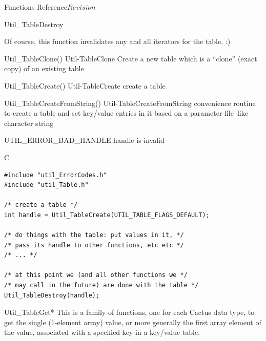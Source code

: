 \begin{cactuspart}{ Functions Reference}{}{$Revision$}
\begin{FunctionDescription}{Util\_TableDestroy}
\begin{Discussion}
Of course, this function invalidates any and all iterators for the table. :)
\end{Discussion}

\begin{SeeAlsoSection}
\begin{SeeAlso2} {Util\_TableClone()} {Util-TableClone}
Create a new table which is a ``clone'' (exact copy) of an existing
table
\end{SeeAlso2}
\begin{SeeAlso2} {Util\_TableCreate()} {Util-TableCreate}
create a table
\end{SeeAlso2}
\begin{SeeAlso2} {Util\_TableCreateFromString()} {Util-TableCreateFromString}
convenience routine to create a table and set key/value entries
in it based on a parameter-file--like character string
\end{SeeAlso2}
\end{SeeAlsoSection}

\begin{ErrorSection}
\begin{Error}{UTIL\_ERROR\_BAD\_HANDLE}
handle is invalid
\end{Error}
\end{ErrorSection}

\begin{ExampleSection}
\begin{Example}{C}
\begin{verbatim}
#include "util_ErrorCodes.h"
#include "util_Table.h"

/* create a table */
int handle = Util_TableCreate(UTIL_TABLE_FLAGS_DEFAULT);

/* do things with the table: put values in it, */
/* pass its handle to other functions, etc etc */
/* ... */

/* at this point we (and all other functions we */
/* may call in the future) are done with the table */
Util_TableDestroy(handle);
\end{verbatim}
\end{Example}
\end{ExampleSection}
\end{FunctionDescription}


\begin{FunctionDescription}{Util\_TableGet*}
\label{Util-TableGet*}
This is a family of functions, one for each Cactus data type,
to get the single (1-element array) value, or more generally the
first array element of the value, associated with a specified key
in a key/value table.


\end{FunctionDescription}
\end{cactuspart}
